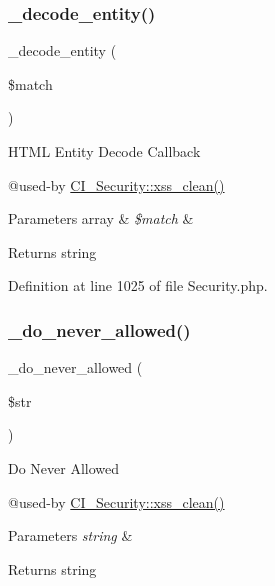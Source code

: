 \subsubsection{\texorpdfstring{\_decode\_entity()}{\_decode\_entity()}}
{\footnotesize\ttfamily \+\_\+decode\+\_\+entity (\begin{DoxyParamCaption}\item[{}]{\$match }\end{DoxyParamCaption})\hspace{0.3cm}{\ttfamily [protected]}}

H\+T\+ML Entity Decode Callback

@used-\/by \mbox{\hyperlink{class_c_i___security_acb759426dbab128d3d8164805225381c}{C\+I\+\_\+\+Security\+::xss\+\_\+clean()}} 
\begin{DoxyParams}[1]{Parameters}
array & {\em \$match} & \\
\hline
\end{DoxyParams}
\begin{DoxyReturn}{Returns}
string 
\end{DoxyReturn}


Definition at line 1025 of file Security.\+php.

\mbox{\label{class_c_i___security_a61217e43f888cdf8afb1fba16b5cd9f6}} 
\subsubsection{\texorpdfstring{\_do\_never\_allowed()}{\_do\_never\_allowed()}}
{\footnotesize\ttfamily \+\_\+do\+\_\+never\+\_\+allowed (\begin{DoxyParamCaption}\item[{}]{\$str }\end{DoxyParamCaption})\hspace{0.3cm}{\ttfamily [protected]}}

Do Never Allowed

@used-\/by \mbox{\hyperlink{class_c_i___security_acb759426dbab128d3d8164805225381c}{C\+I\+\_\+\+Security\+::xss\+\_\+clean()}} 
\begin{DoxyParams}{Parameters}
{\em string} & \\
\hline
\end{DoxyParams}
\begin{DoxyReturn}{Returns}
string 
\end{DoxyReturn}


